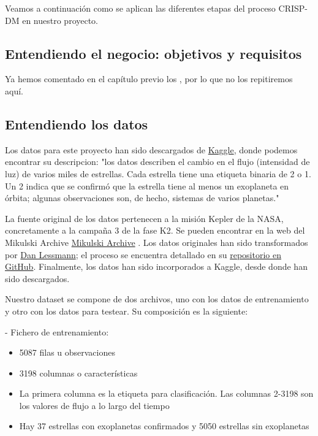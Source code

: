 Veamos a continuación como se aplican las diferentes etapas del proceso CRISP-DM en nuestro proyecto.


\subsection{Entendiendo el negocio: objetivos y requisitos}

Ya hemos comentado en el capítulo previo los , por lo que no los repitiremos aquí.

\subsection{Entendiendo los datos}

Los datos para este proyecto han sido descargados de \href{https://www.kaggle.com/keplersmachines/kepler-labelled-time-series-data}{Kaggle}, donde podemos encontrar su descripcion: "los datos describen el cambio en el flujo (intensidad de luz) de varios miles de estrellas. Cada estrella tiene una etiqueta binaria de 2 o 1. Un 2 indica que se confirmó que la estrella tiene al menos un exoplaneta en órbita; algunas observaciones son, de hecho, sistemas de varios planetas." \cite{Kaggle-exoplanet}

La fuente original de los datos pertenecen a la misión Kepler de la NASA, concretamente a la campaña 3 de la fase K2. Se pueden encontrar en la web del Mikulski Archive \href{https://archive.stsci.edu/k2/}{Mikulski Archive} \cite{Mikulski-Archive}. Los datos originales han sido transformados por \href{http://www.danlessmann.com/index.htm}{Dan Lessmann}; el proceso se encuentra detallado en su \href{https://github.com/winterdelta/KeplerAI}{repositorio en GitHub}. Finalmente, los datos han sido incorporados a Kaggle, desde donde han sido descargados.

Nuestro dataset se compone de dos archivos, uno con los datos de entrenamiento y otro con los datos para testear. Su composición es la siguiente:

- Fichero de entrenamiento:
\begin{itemize}
	\item 5087 filas u observaciones
	\item 3198 columnas o características
	\item La primera columna es la etiqueta para clasificación. Las columnas 2-3198 son los valores de flujo a lo largo del tiempo
	\item Hay 37 estrellas con exoplanetas confirmados y 5050 estrellas sin exoplanetas
\end{itemize}

